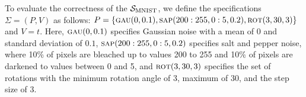   \begin{example}
  To evaluate the correctness of the  $\S_{\text{MNIST}}$, we define the specifications $\Sigma = (P, V)$ as follows: $P = \{\gaussian(0,0.1), \saltpepper(200:255, 0:5, 0.2), \rotation(3,30,3)\}$ and $V=t$. Here, $\gaussian(0,0.1)$ specifies Gaussian noise with a mean of $0$ and standard deviation of $0.1$, $\saltpepper(200:255,0:5,0.2)$ specifies salt and pepper noise, where 10\% of pixels are bleached up to values 200 to 255 and 10\% of pixels are darkened to values between 0 and 5, and $\rotation(3,30,3)$ specifies the set of rotations with the minimum rotation angle of 3, maximum of 30, and the step size of 3.
  \end{example}
  

\smallskip\noindent%





